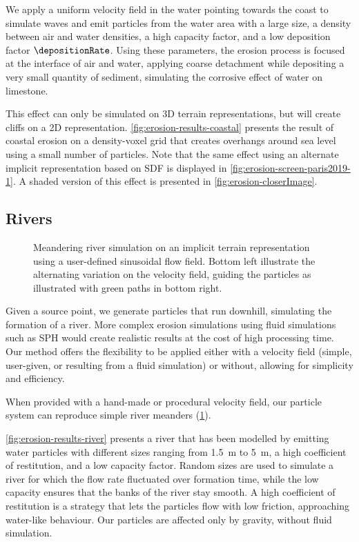 We apply a uniform velocity field in the water pointing towards the coast to simulate waves and emit particles from the water area with a large size, a density between air and water densities, a high capacity factor, and a low deposition factor $\depositionRate$. Using these parameters, the erosion process is focused at the interface of air and water, applying coarse detachment while depositing a very small quantity of sediment, simulating the corrosive effect of water on limestone. 

This effect can only be simulated on 3D terrain representations, but will create cliffs on a 2D representation.  
\cref{fig:erosion-results-coastal} presents the result of coastal erosion on a density-voxel grid that creates overhangs around sea level using a small number of particles. Note that the same effect using an alternate implicit representation based on SDF is displayed in \cref{fig:erosion-screen-paris2019-1}.  
A shaded version of this effect is presented in \cref{fig:erosion-closerImage}.

\subsection{Rivers}

\begin{figure}[H]
    \caption[Meandering river simulation]{Meandering river simulation on an implicit terrain representation using a user-defined sinusoidal flow field. Bottom left illustrate the alternating variation on the velocity field, guiding the particles as illustrated with green paths in bottom right. }
    \label{fig:erosion-results-meanders}
\end{figure}

Given a source point, we generate particles that run downhill, simulating the formation of a river. More complex erosion simulations using fluid simulations such as SPH \cite{Kristof2009} would create realistic results at the cost of high processing time. Our method offers the flexibility to be applied either with a velocity field (simple, user-given, or resulting from a fluid simulation) or without, allowing for simplicity and efficiency.

When provided with a hand-made or procedural velocity field, our particle system can reproduce simple river meanders (\cref{fig:erosion-results-meanders}). %

\cref{fig:erosion-results-river} presents a river that has been modelled by emitting water particles with different sizes ranging from \SI{1.5}{\meter} to \SI{5}{\meter}, a high coefficient of restitution, and a low capacity factor. Random sizes are used to simulate a river for which the flow rate fluctuated over formation time, while the low capacity ensures that the banks of the river stay smooth. A high coefficient of restitution is a strategy that lets the particles flow with low friction, approaching water-like behaviour. Our particles are affected only by gravity, without fluid simulation.


